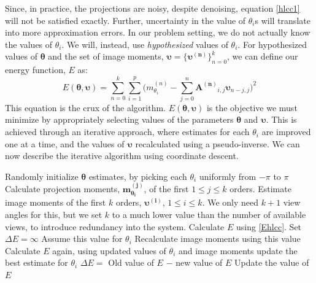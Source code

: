 \documentclass{article}
\begin{document}
Since, in practice, the projections are noisy, despite denoising, equation \ref{hlcc1} will not be satisfied exactly. Further, uncertainty in the value of $\theta_i$s will translate into more approximation errors. In our problem setting, we do not actually know the values of $\theta_i$. We will, instead, use \textit{hypothesized} values of $\theta_i$. For hypothesized values of $\bm{\theta}$ and the set of image moments, $\bm{\upsilon} = \{\bm{\upsilon^{(n)}}\}_{n=0}^k$, we can define our energy function, $E$ as:
\begin{equation}\label{Ehlcc}
E(\bm{\theta}, \bm{\upsilon}) = \sum\limits_{n=0}^k \sum\limits_{i=1}^p \bigg(m^{(n)}_{\theta_i} - \sum\limits_{j=0}^n  \mathbf{A^{(n)}}_{i,j} \mathbf{\upsilon}_{n-j,j}\bigg )^2
\end{equation}
This equation is the crux of the algorithm. $E(\bm{\theta}, \bm{\upsilon})$ is the objective we must minimize by appropriately selecting values of the parameters $\bm{\theta}$ and $\bm{\upsilon}$. This is achieved through an iterative approach, where estimates for each $\theta_i$ are improved one at a time, and the values of $\bm{\upsilon}$ recalculated using a pseudo-inverse. We can now describe the iterative algorithm using coordinate descent.  
\begin{algorithmic}[1]
\State Randomly initialize $\bm{\theta}$ estimates, by picking each $\theta_i$ uniformly from $-\pi$ to $\pi$
\State Calculate projection moments, $\bm{m^{(j)}_{\theta_i}}$, of the first $1 \leq j \leq k$ orders.
\State Estimate image moments of the first $k$ orders, $\bm{\upsilon^{(i)}}$, $1 \leq i \leq k$. We only need $k+1$ view angles for this, but we set $k$ to a much lower value than the number of available views, to introduce redundancy into the system.
\State Calculate $E$ using \ref{Ehlcc}.
\State Set $\Delta E = \infty$
            \State Assume this value for $\theta_i$
            \State Recalculate image moments using this value
            \State Calculate $E$ again, using updated values of $\theta_i$ and image moments
                \State update the best estimate for $\theta_i$
                \State $\Delta E = $ Old value of $E$ $-$ new value of $E$
                \State Update the value of $E$
            \EndIf
        \EndFor
    \EndFor
\EndWhile
\end{algorithmic}
\end{document}
